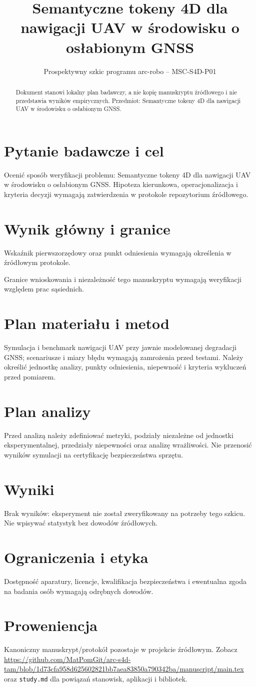 \documentclass[11pt,a4paper]{article}
\title{Semantyczne tokeny 4D dla nawigacji UAV w środowisku o osłabionym GNSS}
\author{}
\date{Prospektywny szkic programu arc-robo -- MSC-S4D-P01}
\begin{document}
\maketitle
\begin{abstract}
Dokument stanowi lokalny plan badawczy, a nie kopię manuskryptu źródłowego i nie przedstawia wyników empirycznych. Przedmiot: Semantyczne tokeny 4D dla nawigacji UAV w środowisku o osłabionym GNSS.
\end{abstract}
\section{Pytanie badawcze i cel}
Ocenić sposób weryfikacji problemu: Semantyczne tokeny 4D dla nawigacji UAV w środowisku o osłabionym GNSS. Hipoteza kierunkowa, operacjonalizacja i kryteria decyzji wymagają zatwierdzenia w protokole repozytorium źródłowego.
\section{Wynik główny i granice}
Wskaźnik pierwszorzędowy oraz punkt odniesienia wymagają określenia w źródłowym protokole.

Granice wnioskowania i niezależność tego manuskryptu wymagają weryfikacji względem prac sąsiednich.
\section{Plan materiału i metod}
Symulacja i benchmark nawigacji UAV przy jawnie modelowanej degradacji GNSS; scenariusze i miary błędu wymagają zamrożenia przed testami. Należy określić jednostkę analizy, punkty odniesienia, niepewność i kryteria wykluczeń przed pomiarem.
\section{Plan analizy}
Przed analizą należy zdefiniować metryki, podziały niezależne od jednostki eksperymentalnej, przedziały niepewności oraz analizę wrażliwości. Nie przenosić wyników symulacji na certyfikację bezpieczeństwa sprzętu.
\section{Wyniki}
Brak wyników: eksperyment nie został zweryfikowany na potrzeby tego szkicu. Nie wpisywać statystyk bez dowodów źródłowych.
\section{Ograniczenia i etyka}
Dostępność aparatury, licencje, kwalifikacja bezpieczeństwa i ewentualna zgoda na badania osób wymagają odrębnych dowodów.
\section{Proweniencja}
Kanoniczny manuskrypt/protokół pozostaje w projekcie źródłowym. Zobacz \url{https://github.com/MatPomGit/arc-s4d-tam/blob/1d73cfa958d625602821bb7aea83850a790342ba/manuscript/main.tex} oraz \texttt{study.md} dla powiązań stanowisk, aplikacji i bibliotek.
\end{document}
